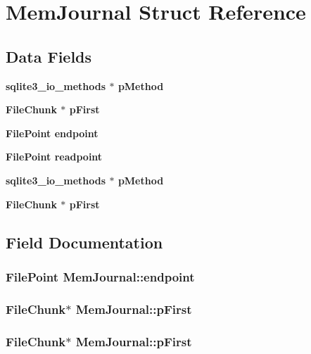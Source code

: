 \section{Mem\-Journal Struct Reference}
\label{structMemJournal}
\subsection*{Data Fields}
\begin{CompactItemize}
\item 
\bf{sqlite3\_\-io\_\-methods} $\ast$ \bf{p\-Method}
\item 
\bf{File\-Chunk} $\ast$ \bf{p\-First}
\item 
\bf{File\-Point} \bf{endpoint}
\item 
\bf{File\-Point} \bf{readpoint}
\item 
\bf{sqlite3\_\-io\_\-methods} $\ast$ \bf{p\-Method}
\item 
\bf{File\-Chunk} $\ast$ \bf{p\-First}
\end{CompactItemize}


\subsection{Field Documentation}
\subsubsection{\setlength{\rightskip}{0pt plus 5cm}\bf{File\-Point} \bf{Mem\-Journal::endpoint}}\label{structMemJournal_0e68a9f99a3a80899da2b8c21f5152a2}


\subsubsection{\setlength{\rightskip}{0pt plus 5cm}\bf{File\-Chunk}$\ast$ \bf{Mem\-Journal::p\-First}}\label{structMemJournal_6f36884a028ccd67c1e7f5f0fb9494aa}


\subsubsection{\setlength{\rightskip}{0pt plus 5cm}\bf{File\-Chunk}$\ast$ \bf{Mem\-Journal::p\-First}}\label{structMemJournal_6f36884a028ccd67c1e7f5f0fb9494aa}


